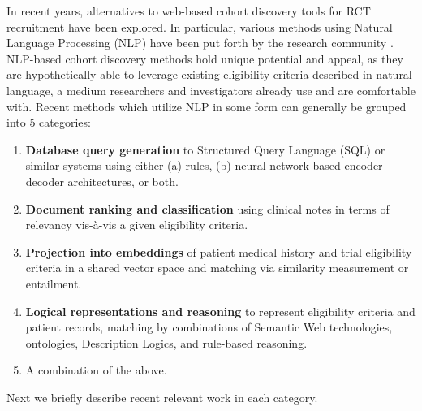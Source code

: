 \documentclass[../main.tex]{subfiles}
\begin{document}
\noindent In recent years, alternatives to web-based cohort discovery tools for RCT recruitment have been explored. In particular, various methods using Natural Language Processing (NLP) have been put forth by the research community \cite{yuan2019criteria2query, soni2020patient, fang2022combining, zhang2020deepenroll, chen2019clinical, patrao2015recruit, dhayne2021emr2vec, liu2021evaluating, xiong2019cohort}. NLP-based cohort discovery methods hold unique potential and appeal, as they are hypothetically able to leverage existing eligibility criteria described in natural language, a medium researchers and investigators already use and are comfortable with. Recent methods which utilize NLP in some form can generally be grouped into 5 categories:

\begin{enumerate}
    \item{\textbf{Database query generation} to Structured Query Language (SQL) or similar systems using either (a) rules, (b) neural network-based encoder-decoder architectures}, or both.
    \item{\textbf{Document ranking and classification} using clinical notes in terms of relevancy vis-à-vis a given eligibility criteria.}
    \item{\textbf{Projection into embeddings} of patient medical history and trial eligibility criteria in a shared vector space and matching via similarity measurement or entailment.}
    \item{\textbf{Logical representations and reasoning} to represent eligibility criteria and patient records, matching by combinations of Semantic Web technologies, ontologies, Description Logics, and rule-based reasoning.}
    \item{A combination of the above.}
\end{enumerate}

\noindent Next we briefly describe recent relevant work in each category. \\
\end{document}
